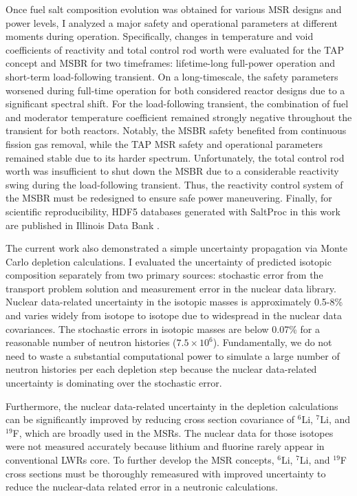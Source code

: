 Once fuel salt composition evolution was obtained for various \gls{MSR} 
designs and power levels, I analyzed a major safety and operational parameters 
at different moments during operation. Specifically, changes in temperature 
and void coefficients of reactivity and total control rod worth were evaluated 
for the \gls{TAP} concept and \gls{MSBR} for two timeframes: lifetime-long 
full-power operation and short-term load-following transient. On a 
long-timescale, the safety parameters worsened during full-time operation for 
both considered reactor designs due to a significant spectral shift. For the 
load-following transient, the combination of fuel and moderator temperature 
coefficient remained strongly negative throughout the transient for both 
reactors. Notably, the \gls{MSBR} safety benefited from continuous fission gas 
removal, while the \gls{TAP} \gls{MSR} safety and operational parameters 
remained stable due to its harder spectrum. Unfortunately, the total control 
rod worth was insufficient to shut down the \gls{MSBR} due to a considerable 
reactivity swing during the load-following transient. Thus, the reactivity 
control system of the \gls{MSBR} must be redesigned to ensure safe power 
maneuvering. Finally, for scientific reproducibility, HDF5 databases generated 
with SaltProc in this work are published in Illinois Data Bank 
\cite{rykhlevskii_saltproc_2020}.

The current work also demonstrated a simple uncertainty propagation via Monte 
Carlo depletion calculations. I evaluated the uncertainty of predicted 
isotopic composition separately from two primary sources: stochastic error 
from the transport problem solution and measurement error in the nuclear data 
library. Nuclear data-related uncertainty in the isotopic masses is 
approximately 0.5-8\% and varies widely from isotope to isotope due to 
widespread in the nuclear data covariances. The stochastic errors in isotopic 
masses are below 0.07\% for a reasonable number of neutron histories 
($7.5\times 10^6$). Fundamentally, we do not need to waste a substantial 
computational power to simulate a large number of neutron histories per each 
depletion step because the nuclear data-related uncertainty is dominating over 
the stochastic error. 

Furthermore, the nuclear data-related uncertainty in the 
depletion calculations can be significantly improved by reducing cross section 
covariance of $^{6}$Li, $^{7}$Li, and $^{19}$F, which are broadly used in the 
\glspl{MSR}. The nuclear data for those isotopes were not measured accurately 
because lithium and fluorine rarely appear in conventional \glspl{LWR} 
core. To further develop the \gls{MSR} concepts, $^{6}$Li, $^{7}$Li, and 
$^{19}$F cross sections must be thoroughly remeasured with improved 
uncertainty to reduce the nuclear-data related error in a neutronic 
calculations.



